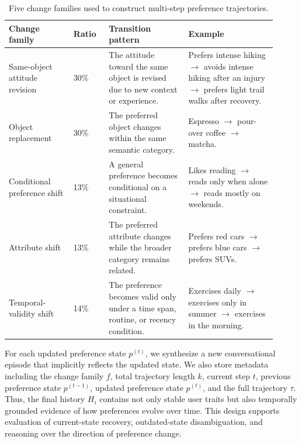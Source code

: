 \documentclass{llmxive}
\begin{document}
\begin{table}[t]
\centering
\small
\begin{tabular}{p{0.22\linewidth}p{0.12\linewidth}p{0.27\linewidth}p{0.30\linewidth}}
\toprule
\textbf{Change family} & \textbf{Ratio} & \textbf{Transition pattern} & \textbf{Example} \\
\midrule
Same-object attitude revision
& 30\%
& The attitude toward the same object is revised due to new context or experience.
& Prefers intense hiking $\rightarrow$ avoids intense hiking after an injury $\rightarrow$ prefers light trail walks after recovery. \\

Object replacement
& 30\%
& The preferred object changes within the same semantic category.
& Espresso $\rightarrow$ pour-over coffee $\rightarrow$ matcha. \\

Conditional preference shift
& 13\%
& A general preference becomes conditional on a situational constraint.
& Likes reading $\rightarrow$ reads only when alone $\rightarrow$ reads mostly on weekends. \\

Attribute shift
& 13\%
& The preferred attribute changes while the broader category remains related.
& Prefers red cars $\rightarrow$ prefers blue cars $\rightarrow$ prefers SUVs. \\

Temporal-validity shift
& 14\%
& The preference becomes valid only under a time span, routine, or recency condition.
& Exercises daily $\rightarrow$ exercises only in summer $\rightarrow$ exercises in the morning. \\
\bottomrule
\end{tabular}
\caption{Five change families used to construct multi-step preference trajectories.}
\label{tab:persona_mem_evo_change_families}
\end{table}

For each updated preference state $p^{(t)}$, we synthesize a new conversational episode that implicitly reflects the updated state. We also store metadata including the change family $f$, total trajectory length $k$, current step $t$, previous preference state $p^{(t-1)}$, updated preference state $p^{(t)}$, and the full trajectory $\tau$. Thus, the final history $H_i$ contains not only stable user traits but also temporally grounded evidence of how preferences evolve over time. This design supports evaluation of current-state recovery, outdated-state disambiguation, and reasoning over the direction of preference change.
\end{document}

